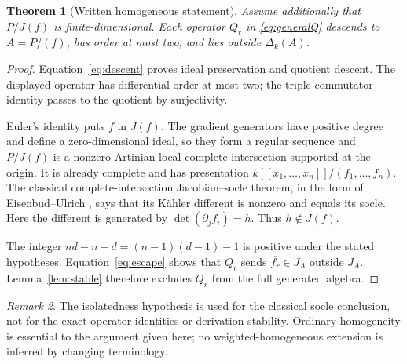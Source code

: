 \documentclass[11pt,letterpaper]{article}
\newtheorem{theorem}{Theorem}[section]
\theoremstyle{remark}\newtheorem{remark}[theorem]{Remark}
\begin{document}
\begin{theorem}[Written homogeneous statement]\label{thm:general}
Assume additionally that \(P/J(f)\) is finite-dimensional. Each operator
\(Q_r\) in \eqref{eq:generalQ} descends to \(A=P/(f)\), has order at most
two, and lies outside \(\Delta_k(A)\).
\end{theorem}
\begin{proof}
Equation~\eqref{eq:descent} proves ideal preservation and quotient descent.
The displayed operator has differential order at most two; the triple
commutator identity passes to the quotient by surjectivity.

Euler's identity puts \(f\) in \(J(f)\). The gradient generators have positive
degree and define a zero-dimensional ideal, so they form a regular sequence
and \(P/J(f)\) is a nonzero Artinian local complete intersection supported
at the origin. It is already complete and has presentation
\(k[[x_1,\ldots,x_n]]/(f_1,\ldots,f_n)\).
The classical complete-intersection Jacobian--socle theorem, in the form of
Eisenbud--Ulrich \cite[Theorem 7.1, p.~210]{EU}, says that its K\"ahler
different is nonzero and equals its socle. Here the different is generated
by \(\det(\partial_jf_i)=h\). Thus \(h\notin J(f)\).

The integer \(nd-n-d=(n-1)(d-1)-1\) is positive under the stated hypotheses.
Equation~\eqref{eq:escape} shows that \(Q_r\) sends
\(\overline{f_r}\in J_A\) outside \(J_A\). Lemma~\ref{lem:stable}
therefore excludes \(Q_r\) from the full generated algebra.
\end{proof}
\begin{remark}
The isolatedness hypothesis is used for the classical socle conclusion, not
for the exact operator identities or derivation stability. Ordinary
homogeneity is essential to the argument given here; no weighted-homogeneous
extension is inferred by changing terminology.
\end{remark}
\end{document}
